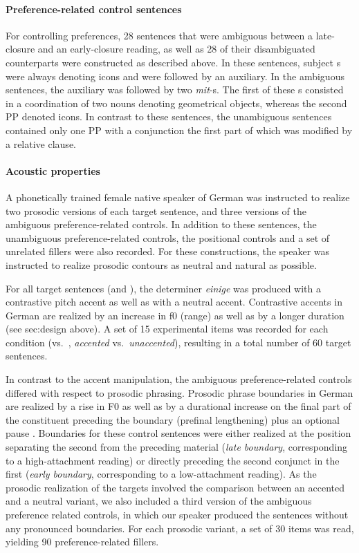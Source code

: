 \documentclass[fleqn,reqno,10pt,draft]{article}
\newcommand{\as}{\acro{as}}
\renewcommand{\es}{\acro{es}}
\begin{document}
\paragraph{Preference-related control sentences}
For controlling preferences, 28 sentences that were ambiguous between
a late-closure and an early-closure reading, as well as 28 of their
disambiguated counterparts were constructed as described above. In
these sentences, subject {\small {}}s were always denoting
icons and were followed by an auxiliary. In the ambiguous sentences,
the auxiliary was followed by two {\it mit}-{\small {}}s.  The
first of these {\small {}}s consisted in a coordination of two
nouns denoting geometrical objects, whereas the second PP denoted
icons. In contrast to these sentences, the unambiguous sentences
contained only one PP with a conjunction the first part of which was
modified by a relative clause.

\paragraph{Acoustic properties}
A phonetically trained female native speaker of German was instructed
to realize two prosodic versions of each target sentence, and three
versions of the ambiguous preference-related controls. In addition to these
sentences, the unambiguous preference-related controls, the positional controls
and a set of unrelated fillers were also recorded. For these constructions, the speaker was instructed
to realize prosodic contours as neutral and natural as possible.

For all target sentences (\as and \es), the determiner \emph{einige} was
produced with a contrastive pitch accent as well as with a neutral
accent. Contrastive accents in German are realized by an increase in f0 (range)
as well as by a longer duration (see {sec:design} above). A set of 15 
experimental items was recorded for each condition (\as vs.~\es, \emph{accented} 
vs.~\emph{unaccented}), resulting in a total number of 60 target sentences.

In contrast to the accent manipulation, the ambiguous preference-related controls
differed with respect to prosodic phrasing. Prosodic phrase boundaries
in German are realized by a rise in F0 as well as by a durational
increase on the final part of the constituent preceding the boundary
(prefinal lengthening) plus an optional pause \citep[e.g.][]{Vaissiere83,Fery93}.
Boundaries for these control sentences were either realized at the position 
separating the second {\small {}}
from the preceding material (\emph{late boundary}, corresponding to a
high-attachment reading) or directly preceding the second conjunct in
the first {\small {}} (\emph{early boundary}, corresponding to a
low-attachment reading). As the prosodic realization of the targets
involved the comparison between an accented and a neutral variant, we
also included a third version of the ambiguous preference related controls, in which our
speaker produced the sentences without any pronounced
boundaries. For each prosodic variant, a set of
30 items was read, yielding 90 preference-related fillers.
\end{document}
